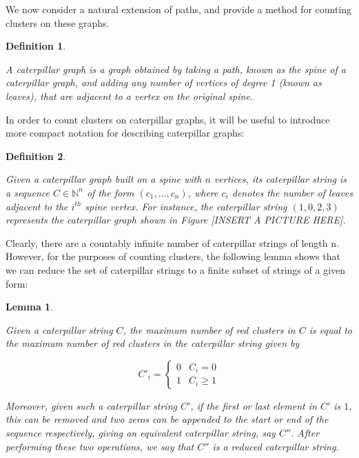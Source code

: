 \documentclass{mpaper}
\newtheorem{definition}{Definition}[section]
\newtheorem{lemma}{Lemma}[section]
\begin{document}
We now consider a natural extension of paths, and provide a method for counting clusters on these graphs.

\begin{definition}
  \label{def/caterpillars}

  A \emph{caterpillar graph} is a graph obtained by taking a path, known as the \emph{spine} of a caterpillar graph, and adding any number of vertices of degree 1 (known as leaves), that are adjacent to a vertex on the original spine.

\end{definition}

In order to count clusters on caterpillar graphs, it will be useful to introduce more compact notation for describing caterpillar graphs:

\begin{definition}
  \label{def/caterpillar-strings}

  Given a caterpillar graph built on a spine with $n$ vertices, its \emph{caterpillar string} is a sequence $C \in \mathbb{N}^n$ of the form $(c_1, \dots, c_n)$, where $c_i$ denotes the number of leaves adjacent to the $i^{th}$ spine vertex. For instance, the caterpillar string $(1,0,2,3)$ represents the caterpillar graph shown in Figure [INSERT A PICTURE HERE].

\end{definition}

Clearly, there are a countably infinite number of caterpillar strings of length n. However, for the purposes of counting clusters, the following lemma shows that we can reduce the set of caterpillar strings to a finite subset of strings of a given form:

\begin{lemma}
  \label{lem/reduced-caterpillars}

  Given a caterpillar string $C$, the maximum number of red clusters in $C$ is equal to the maximum number of red clusters in the caterpillar string given by

  \begin{equation*}
  C'_i = \begin{cases}
    0 & C_i = 0 \\
    1 & C_i \geq 1
  \end{cases}
  \end{equation*}

  Moreover, given such a caterpillar string $C'$, if the first or last element in $C'$ is $1$, this can be removed and two zeros can be appended to the start or end of the sequence respectively, giving an equivalent caterpillar string, say $C''$. After performing these two operations, we say that $C''$ is a \emph{reduced caterpillar string}.
\end{lemma}
\end{document}
